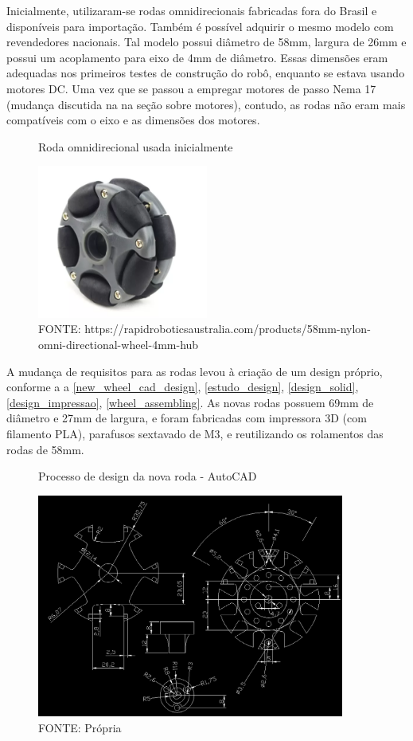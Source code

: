 Inicialmente, utilizaram-se rodas omnidirecionais fabricadas fora do Brasil e disponíveis para importação. Também é
possível adquirir o mesmo modelo com revendedores nacionais.
Tal modelo possui diâmetro de 58mm, largura de 26mm e possui um acoplamento para eixo de 4mm de diâmetro. Essas
dimensões eram adequadas nos primeiros testes de construção do robô, enquanto se estava usando motores DC. Uma vez que
se passou a empregar motores de passo Nema 17 (mudança discutida na na seção sobre motores), contudo, as rodas não eram
mais compatíveis com o eixo e as dimensões dos motores.

\begin{figure}[h]
	\centering
	\caption{Roda omnidirecional usada inicialmente}
	\includegraphics[width=0.5\textwidth]{figures/roda_china.png}
    \caption*{FONTE: https://rapidroboticsaustralia.com/products/58mm-nylon-omni-directional-wheel-4mm-hub}
\end{figure}

A mudança de requisitos para as rodas levou à criação de um design próprio, conforme a
a 
\autoref{new_wheel_cad_design},
\autoref{estudo_design},
\autoref{design_solid},
\autoref{design_impressao},
\autoref{wheel_assembling}. As novas rodas possuem 69mm de diâmetro e 27mm de largura,
e foram fabricadas com impressora
3D (com filamento PLA), parafusos sextavado de M3, e reutilizando os rolamentos das rodas de 58mm.

\begin{figure}[h]
	\centering
	\caption{Processo de design da nova roda - AutoCAD}
	\label{new_wheel_cad_design}
	\includegraphics[width=0.9\textwidth]{figures/roda_processo_desing_passo1}
    \caption*{FONTE: Própria}
\end{figure}

